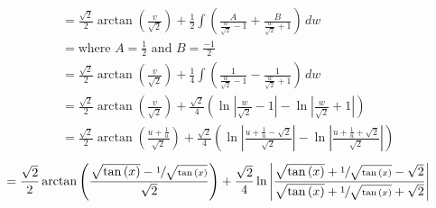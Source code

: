 \documentclass[12pt]{article}
\begin{document}
\[\begin{aligned}
        &= \frac{\sqrt{2}}{2}\arctan{\left(\frac{v}{\sqrt{2}}\right)} + \frac{1}{2}\int \left(\frac{A}{\frac{w}{\sqrt{2}} - 1} + \frac{B}{\frac{w}{\sqrt{2}} + 1}\right) \, dw \\
        &= \text{where } A = \frac{1}{2} \text{ and } B = \frac{-1}{2} \\
        &= \frac{\sqrt{2}}{2}\arctan{\left(\frac{v}{\sqrt{2}}\right)} + \frac{1}{4}\int \left(\frac{1}{\frac{w}{\sqrt{2}} - 1} - \frac{1}{\frac{w}{\sqrt{2}} + 1}\right) \, dw \\
        &= \frac{\sqrt{2}}{2}\arctan{\left(\frac{v}{\sqrt{2}}\right)} + \frac{\sqrt{2}}{4} \left(\ln{\left|\frac{w}{\sqrt{2}} - 1\right|} - \ln{\left|\frac{w}{\sqrt{2}} + 1\right|}\right) \\
        &= \frac{\sqrt{2}}{2}\arctan{\left(\frac{u + \frac{1}{u}}{\sqrt{2}}\right)} + \frac{\sqrt{2}}{4} \left(\ln{\left|\frac{u + \frac{1}{u} - \sqrt{2}}{\sqrt{2}}\right|} - \ln{\left|\frac{u + \frac{1}{u} + \sqrt{2}}{\sqrt{2}}\right|}\right)
        \end{aligned}
    \]
    \[ 
        \begin{aligned}
        &= \dfrac{\sqrt{2}}{2}\arctan{ 
            \left(
                \dfrac{ \sqrt{\tan{(x)}} 
                - \sfrac{1}{ \sqrt{\tan{(x)}}}}{\sqrt{2}} 
            \right)
        }
        + \dfrac{\sqrt{2}}{4} 
        \ln{\left| 
            \dfrac{\sqrt{\tan{(x)}} + \sfrac{1}{ \sqrt{\tan{(x)}}} - \sqrt{2}}
            {\sqrt{\tan{(x)}} + \sfrac{1}{ \sqrt{\tan{(x)}}} + \sqrt{2}}
        \right|}
        \end{aligned}
    \]
        
    
\end{document}
